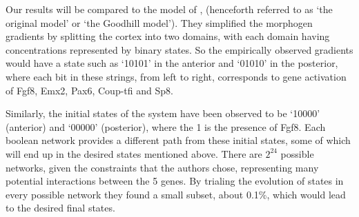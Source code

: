 \documentclass[a4paper,11pt]{article}
\begin{document}

Our results will be compared to the model of \cite{Giacomantonio2010}, (henceforth referred to as `the original model' or `the Goodhill model'). They simplified the morphogen gradients by splitting the cortex into two domains, with each domain having concentrations represented by binary states. So the  empirically observed gradients would have a state such as `10101' in the anterior and `01010' in the posterior, where each bit in these strings, from left to right, corresponds to gene activation of Fgf8, Emx2, Pax6, Coup-tfi and Sp8.\par

Similarly, the initial states of the system have been observed to be `10000' (anterior) and `00000' (posterior), where the 1 is the presence of Fgf8. Each boolean network provides a different path from these initial states, some of which will end up in the desired states mentioned above. There are $2^{24}$ possible networks, given the constraints that the authors chose, representing many potential interactions between the 5 genes. By trialing the evolution of states in every possible network they found a small subset, about 0.1\%, which would lead to the desired final states.\par
\end{document}
